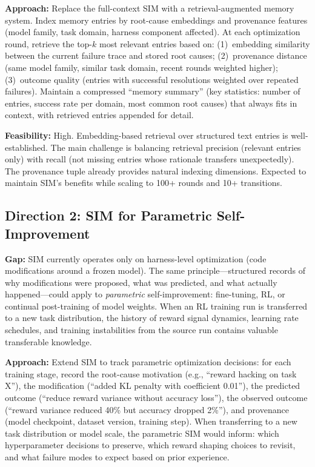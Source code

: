 \documentclass[11pt,a4paper]{article}
\begin{document}
\textbf{Approach:} Replace the full-context SIM with a retrieval-augmented memory system. Index memory entries by root-cause embeddings and provenance features (model family, task domain, harness component affected). At each optimization round, retrieve the top-$k$ most relevant entries based on: (1)~embedding similarity between the current failure trace and stored root causes; (2)~provenance distance (same model family, similar task domain, recent rounds weighted higher); (3)~outcome quality (entries with successful resolutions weighted over repeated failures). Maintain a compressed ``memory summary'' (key statistics: number of entries, success rate per domain, most common root causes) that always fits in context, with retrieved entries appended for detail.

\textbf{Feasibility:} High. Embedding-based retrieval over structured text entries is well-established. The main challenge is balancing retrieval precision (relevant entries only) with recall (not missing entries whose rationale transfers unexpectedly). The provenance tuple already provides natural indexing dimensions. Expected to maintain SIM's benefits while scaling to 100+ rounds and 10+ transitions.

\subsection{Direction 2: SIM for Parametric Self-Improvement}
\textbf{Gap:} SIM currently operates only on harness-level optimization (code modifications around a frozen model). The same principle---structured records of why modifications were proposed, what was predicted, and what actually happened---could apply to \emph{parametric} self-improvement: fine-tuning, RL, or continual post-training of model weights. When an RL training run is transferred to a new task distribution, the history of reward signal dynamics, learning rate schedules, and training instabilities from the source run contains valuable transferable knowledge.

\textbf{Approach:} Extend SIM to track parametric optimization decisions: for each training stage, record the root-cause motivation (e.g., ``reward hacking on task X''), the modification (``added KL penalty with coefficient 0.01''), the predicted outcome (``reduce reward variance without accuracy loss''), the observed outcome (``reward variance reduced 40\% but accuracy dropped 2\%''), and provenance (model checkpoint, dataset version, training step). When transferring to a new task distribution or model scale, the parametric SIM would inform: which hyperparameter decisions to preserve, which reward shaping choices to revisit, and what failure modes to expect based on prior experience.
\end{document}
